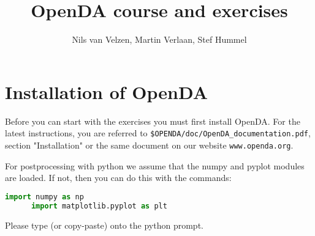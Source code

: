 \documentclass[a4paper,10pt]{article}
\title{OpenDA course and exercises}
\author{Nils van Velzen, Martin Verlaan, Stef Hummel}
\begin{document}

\maketitle



\section*{Installation of OpenDA}
Before you can start with the exercises you must first install OpenDA. For the
latest instructions, you are referred to \verb|$OPENDA/doc/OpenDA_documentation.pdf|, 
section "Installation" or the same document on our website \verb|www.openda.org|.

For postprocessing with python we assume that the numpy and pyplot modules are loaded. If not, then you
can do this with the commands:
      \begin{lstlisting}[language=Python,frame=single,caption={Python initialize}]
      import numpy as np
      import matplotlib.pyplot as plt
      \end{lstlisting}
Please type (or copy-paste) onto the python prompt.
\end{document}
